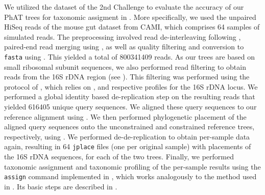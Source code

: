 We utilized the  dataset of the 2nd  Challenge \cite{Sczyrba2017,Bremges2018}
to evaluate the accuracy of our \ac{PhAT} trees for taxonomic assigment
in .
More specifically, we used the unpaired HiSeq reads of the mouse gut dataset from CAMI,
which comprises \num{64} samples of simulated reads.
The preprocessing involved read de-interleaving following ,
paired-end read merging using  \cite{Zhang2014},
as well as quality filtering and conversion to \texttt{fasta} using  \cite{Rognes2016}.
This yielded a total of \num{800 341 409} reads.
As our trees are based on small ribosomal subunit sequences,
we also performed read filtering to obtain reads from the 16S rDNA region
(see ).
This filtering was performed using the protocol of ,
which relies on  \cite{Eddy1998,Eddy2009}, and respective profiles for the 16S rDNA locus.
We performed a global identity based de-replication step on the resulting reads
that yielded \num{616 405} unique query sequences.
We aligned these query sequences to our  reference alignment
using  \cite{Berger2011a,Berger2012}.
We then performed phylogenetic placement of the aligned query sequences onto the unconstrained and constrained reference trees,
respectively, using  \cite{Barbera2018}.
We performed de-de-replication to obtain per-sample data again, %
resulting in \num{64} \texttt{jplace} files (one per original sample) with placements of the 16S rDNA sequences,
for each of the two trees.
Finally, we performed taxonomic assignment and taxonomic profiling of the per-sample results
using the \texttt{assign} command implemented in  \cite{Czech2019-genesis-gappa},
which works analogously to the method used in  \cite{Kozlov2016}.
Its basic steps are described in .
